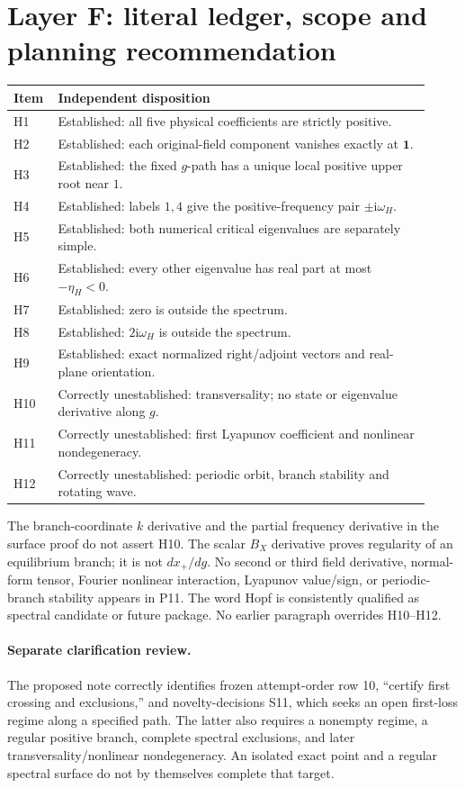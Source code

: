 \documentclass[11pt]{article}
\newcommand{\ii}{\mathrm i}
\newcommand{\one}{\mathbf 1}
\begin{document}
\section{Layer F: literal ledger, scope and planning recommendation}
\label{sec:F}
\begin{longtable}{p{0.08\linewidth}p{0.84\linewidth}}
\toprule Item&Independent disposition\\\midrule\endhead
H1&Established: all five physical coefficients are strictly positive.\\
H2&Established: each original-field component vanishes exactly at $\one$.\\
H3&Established: the fixed $g$-path has a unique local positive upper root near $1$.\\
H4&Established: labels $1,4$ give the positive-frequency pair $\pm\ii\omega_H$.\\
H5&Established: both numerical critical eigenvalues are separately simple.\\
H6&Established: every other eigenvalue has real part at most $-\eta_H<0$.\\
H7&Established: zero is outside the spectrum.\\
H8&Established: $2\ii\omega_H$ is outside the spectrum.\\
H9&Established: exact normalized right/adjoint vectors and real-plane orientation.\\
H10&Correctly unestablished: transversality; no state or eigenvalue derivative along $g$.\\
H11&Correctly unestablished: first Lyapunov coefficient and nonlinear nondegeneracy.\\
H12&Correctly unestablished: periodic orbit, branch stability and rotating wave.\\
\bottomrule
\end{longtable}
The branch-coordinate $k$ derivative and the partial frequency derivative
in the surface proof do not assert H10. The scalar $B_X$ derivative proves
regularity of an equilibrium branch; it is not $dx_+/dg$. No second or
third field derivative, normal-form tensor, Fourier nonlinear interaction,
Lyapunov value/sign, or periodic-branch stability appears in P11.
The word Hopf is consistently qualified as spectral candidate or future
package. No earlier paragraph overrides H10--H12.

\paragraph{Separate clarification review.}
The proposed note correctly identifies frozen attempt-order row 10,
``certify first crossing and exclusions,'' and novelty-decisions S11,
which seeks an open first-loss regime along a specified path. The latter
also requires a nonempty regime, a regular positive branch, complete
spectral exclusions, and later transversality/nonlinear nondegeneracy.
An isolated exact point and a regular spectral surface do not by themselves
complete that target.
\end{document}
